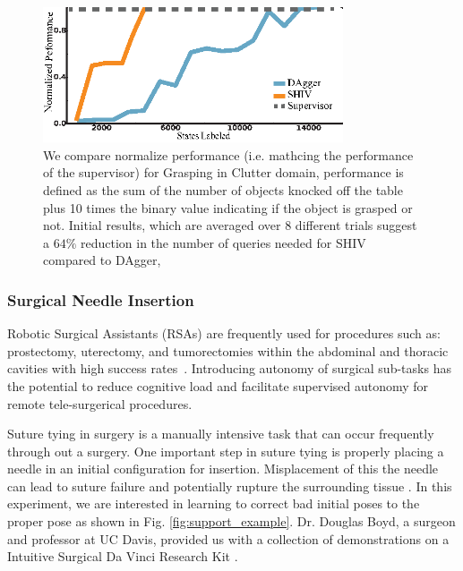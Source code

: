 \documentclass[10pt, conference]{ieeeconf}      %
\begin{document}
\begin{figure}[t!]
\centering
\includegraphics[width=\columnwidth, height=4cm]{figures/grasp_clutter.eps}
\caption{ \footnotesize We compare normalize performance (i.e. mathcing the performance of the supervisor) for Grasping in Clutter domain, performance is defined as the sum of the number of objects knocked off the table plus 10 times the binary value indicating if the object is grasped or not. Initial results, which are averaged over 8 different trials suggest a $64\%$ reduction in the number of queries needed for SHIV compared to DAgger,}
\vspace*{-20pt}
\label{fig:grasp_cost}
\end{figure}




\subsubsection{Surgical Needle Insertion}

Robotic Surgical Assistants (RSAs) are frequently used for procedures such as: prostectomy, uterectomy, and tumorectomies within the abdominal and thoracic cavities with high success rates~\cite{van2013laparoscopic,darzi2004impact}. Introducing autonomy of surgical sub-tasks has the potential to reduce cognitive load and facilitate supervised autonomy for remote tele-surgerical procedures.

Suture tying in surgery is a manually intensive task that can occur frequently through out a surgery. One important step
in suture tying is properly placing a needle in an initial configuration for insertion. Misplacement of this the needle
can lead to suture failure and potentially rupture the surrounding tissue \cite{liu2015optimal}. In this experiment, we
are interested in learning to correct bad initial poses to the proper pose as shown in Fig.
\ref{fig:support_example}. Dr. Douglas Boyd, a surgeon and professor at UC Davis, provided us with a collection of demonstrations on a Intuitive Surgical Da Vinci Research Kit \cite{AnnualReport2014}.
\end{document}
